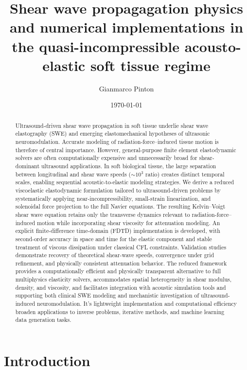\documentclass[11pt]{article}
\title{Shear wave propagagation physics and numerical implementations in the quasi-incompressible acousto-elastic soft tissue regime}
\author{Gianmarco Pinton}
\date{\today}
\begin{document}
\maketitle

\begin{abstract}

    Ultrasound-driven shear wave propagation in soft tissue underlie shear wave
    elastography (SWE) and emerging elastomechanical hypotheses of ultrasonic
    neuromodulation. Accurate modeling of radiation-force–induced tissue motion is
    therefore of central importance. However, general-purpose finite element
    elastodynamic solvers are often computationally expensive and unnecessarily
    broad for shear-dominant ultrasound applications. In soft biological tissue, the
    large separation between longitudinal and shear wave speeds ($\sim 10^3$ ratio)
    creates distinct temporal scales, enabling sequential acoustic-to-elastic
    modeling strategies. We derive a reduced viscoelastic elastodynamic formulation tailored to
    ultrasound-driven problems by systematically applying near-incompressibility,
    small-strain linearization, and solenoidal force projection to the full Navier
    equations. The resulting Kelvin--Voigt shear wave equation retains only the
    transverse dynamics relevant to radiation-force–induced motion while
    incorporating shear viscosity for attenuation modeling.     An explicit
    finite-difference time-domain (FDTD) implementation is developed, with
    second-order accuracy in space and time for the elastic component and stable
    treatment of viscous dissipation under classical CFL constraints.
     Validation studies demonstrate recovery of theoretical shear-wave speeds,
    convergence under grid refinement, and physically consistent attenuation
    behavior. The reduced framework provides a computationally efficient and
    physically transparent alternative to full multiphysics elasticity solvers,
    accommodates spatial heterogeneity in shear modulus, density, and viscosity,
    and facilitates integration with acoustic simulation tools and supporting both
    clinical SWE modeling and mechanistic investigation of ultrasound-induced
    neuromodulation. It's lightweight implementation and computational efficiency broaden applications to
     inverse problems, iterative methods, and machine learning data generation tasks.

    \end{abstract}

\section{Introduction}
\end{document}
